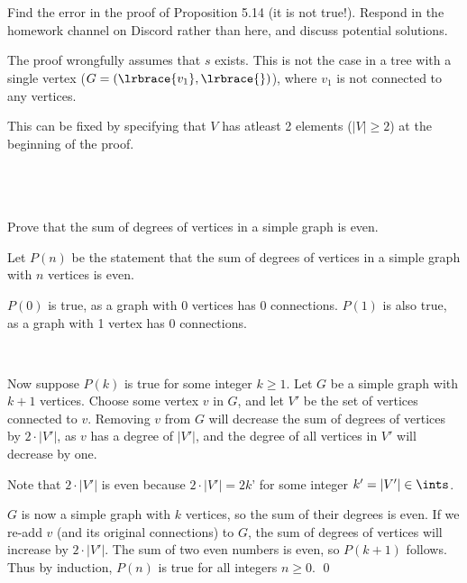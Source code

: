 \documentclass{article}
\begin{document}
\section{}

\begin{problem*}
Find the error in the proof of Proposition 5.14 (it is not true!). Respond in the homework channel on Discord rather than here, and discuss potential solutions.
\end{problem*}

The proof wrongfully assumes that $s$ exists. This is not the case in a tree with a single vertex ($G=(\lrbrace{v_1},\lrbrace{})$), where $v_1$ is not connected to any vertices.

This can be fixed by specifying that $V$ has atleast 2 elements ($|V|\geq 2$) at the beginning of the proof.


\
\hline
\section{}

\begin{problem*}
Prove that the sum of degrees of vertices in a simple graph is even.
\end{problem*}

Let $P( n)$ be the statement that the sum of degrees of vertices in a simple graph with $n$ vertices is even. 

$P( 0)$ is true, as a graph with 0 vertices has 0 connections. $P( 1)$ is also true, as a graph with 1 vertex has 0 connections. 

\

Now suppose $P( k)$ is true for some integer $k\geq 1$. Let $G$ be a simple graph with $k+1$ vertices. Choose some vertex $v$ in $G$, and let $V'$ be the set of vertices connected to $v$. Removing $v$ from $G$ will decrease the sum of degrees of vertices by $2\cdot |V'|$, as $v$ has a degree of $|V'|$, and the degree of all vertices in $V'$ will decrease by one. 

Note that $2\cdot |V'|$ is even because $2\cdot |V'|=2k$' for some integer $k'=|V'|\in \ints$.

$G$ is now a simple graph with $k$ vertices, so the sum of their degrees is even. If we re-add $v$ (and its original connections) to $G$, the sum of degrees of vertices will increase by $2\cdot |V'|$. The sum of two even numbers is even, so $P( k+1)$ follows. Thus by induction, $P( n)$ is true for all integers $n\geq 0$. \qed
\end{document}
